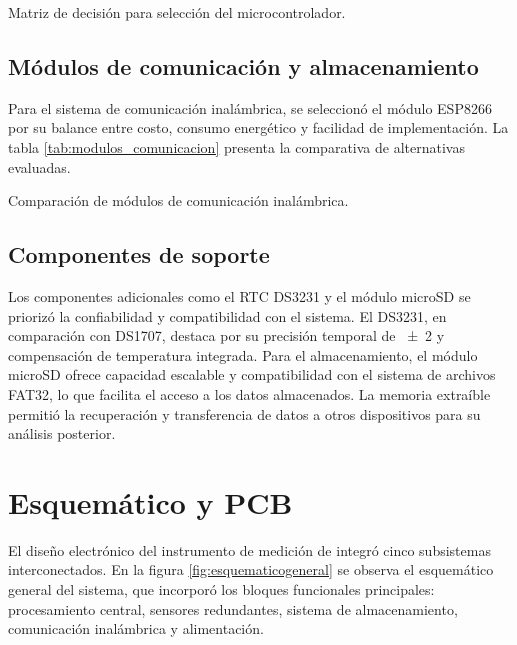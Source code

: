 \begin{table}[htbp]
	\centering
	\small
	\caption{Matriz de decisión para selección del microcontrolador.}
	\label{tab:decision_micro}

\end{table}

\subsection{Módulos de comunicación y almacenamiento}

Para el sistema de comunicación inalámbrica, se seleccionó el módulo ESP8266 por su balance entre costo, consumo energético y facilidad de implementación. La tabla \ref{tab:modulos_comunicacion} presenta la comparativa de alternativas evaluadas.

\begin{table}[htbp]
	\centering
	\small
	\caption{Comparación de módulos de comunicación inalámbrica.}
	\label{tab:modulos_comunicacion}
	
\end{table}

\subsection{Componentes de soporte}

Los componentes adicionales como el RTC DS3231 y el módulo microSD se priorizó la confiabilidad y compatibilidad con el sistema. El DS3231, en comparación con DS1707, destaca por su precisión temporal de \SI{\pm2}{\ppm} y compensación de temperatura integrada. Para el almacenamiento, el módulo microSD ofrece capacidad escalable y compatibilidad con el sistema de archivos FAT32, lo que facilita el acceso a los datos almacenados. La memoria extraíble permitió la recuperación y transferencia de datos a otros dispositivos para su análisis posterior.


\section{Esquemático y PCB}	

El diseño electrónico del instrumento de medición de \MPF integró cinco subsistemas interconectados. En la figura \ref{fig:esquematicogeneral} se observa el esquemático general del sistema, que incorporó los bloques funcionales principales: procesamiento central, sensores redundantes, sistema de almacenamiento, comunicación inalámbrica y alimentación.

